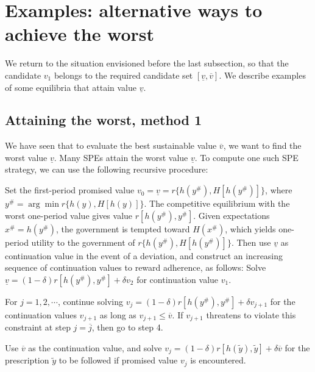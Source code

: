 

\section{Examples: alternative ways to achieve the worst}\label{sec:altworst}%
We return to the situation envisioned before the last subsection,
so that the candidate $v_1$ belongs to the required candidate
set $[\underline v, \overline v]$. We describe examples
of some equilibria that attain value $\underline v$.


\subsection{Attaining the worst, method 1}
We have seen that to evaluate the best sustainable value
$\overline v$, we want to find the
worst value $\underline v$.  Many SPEs attain the worst
value $\underline v$.  To compute one such SPE strategy,
we can use the following recursive procedure:

\smallskip
{} Set the first-period promised value
$v_0 =\underline{v} = r \{ h(y^\#), H [h(y^\#)] \}$,
where $y^\# = \arg\min r\{ h(y),H [h(y)]\}$.
The competitive equilibrium with the worst one-period
value gives value
$r [h(y^\#), y^\#]$. Given expectations $x^\#=h(y^\#)$, the government
is tempted toward $H(x^\#)$, which yields one-period
utility to the government of
$r \{ h(y^\#), H [h(y^\#)]\}$.
Then use $\underline v$ as continuation value in the
event of a deviation, and construct an increasing sequence of
 continuation values to reward adherence, as follows:
\smallskip
{} Solve
$\underline{v} = (1-\delta) r [h(y^\#),y^\#] + \delta v_2$
for continuation value $v_1$.

\smallskip
{} For $j=1,2,\cdots$, continue solving
$v_j = (1-\delta) r[h(y^\#), y^\#] + \delta v_{j+1}$
for the continuation values $v_{j+1}$ as long as $v_{j+1} \leq \overline v$. If
$v_{j+1}$ threatens to violate this constraint at step $j =
\overline j$, then go to step 4.

\smallskip
{} Use $\overline v$ as the continuation value, and solve
$v_j = (1-\delta) r[h(\tilde y), \tilde y] + \delta \overline v$
for the prescription $\tilde y$ to be followed if promised value
$v_j$ is encountered.


